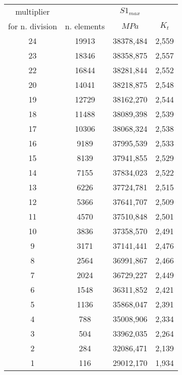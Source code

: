 \begin{tabular}{cccc}
 \hline
  multiplier	  &				&	$S1_{max}$\\
  for n. division & n. elements &   $MPa$	&  $K_{t}$\\
  \hline
  24 &      19913 &           38378,484     &          2,559\\
  23 &      18346 &           38358,875     &          2,557\\
  22 &      16844 &           38281,844     &          2,552\\
  20 &      14041 &           38218,875     &          2,548\\
  19 &      12729 &           38162,270     &          2,544\\
  18 &      11488 &           38089,398     &          2,539\\
  17 &      10306 &           38068,324     &          2,538\\
  16 &       9189 &           37995,539     &          2,533\\
  15 &       8139 &           37941,855     &          2,529\\
  14 &       7155 &           37834,023     &          2,522\\
  13 &       6226 &           37724,781     &          2,515\\
  12 &       5366 &           37641,707     &          2,509\\
  11 &       4570 &           37510,848     &          2,501\\
  10 &       3836 &           37358,570     &          2,491\\
   9 &       3171 &           37141,441     &          2,476\\
   8 &       2564 &           36991,867     &          2,466\\
   7 &       2024 &           36729,227     &          2,449\\
   6 &       1548 &           36311,852     &          2,421\\
   5 &       1136 &           35868,047     &          2,391\\
   4 &        788 &           35008,906     &          2,334\\
   3 &        504 &           33962,035     &          2,264\\
   2 &        284 &           32086,471     &          2,139\\
   1 &        116 &           29012,170     &          1,934\\
  \hline
\end{tabular}